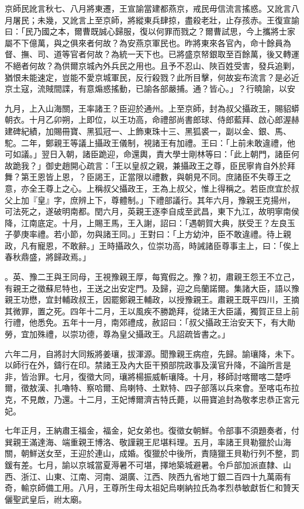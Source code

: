\begin{pinyinscope}
京師民訛言秋七、八月將東遷，王宣諭當建都燕京，戒民毋信流言搖惑。又訛言八月屠民；未幾，又訛言上至京師，將縱東兵肆掠，盡殺老壯，止存孩赤。王復宣諭曰：「民乃國之本，爾曹既誠心歸服，復以何罪而戮之？爾曹試思，今上攜將士家屬不下億萬，與之俱來者何故？為安燕京軍民也。昨將東來各官內，命十餘員為督、撫、司、道等官者何故？為統一天下也。已將盛京帑銀取至百餘萬，後又轉運不絕者何故？為供爾京城內外兵民之用也。且予不忍山、陜百姓受害，發兵追剿，猶恨未能速定，豈能不愛京城軍民，反行殺戮？此所目擊，何故妄布流言？是必近京土寇，流賊間諜，有意煽惑搖動，已諭各部嚴捕。通？皆心。」？行曉諭，以安

九月，上入山海關，王率諸王？臣迎於通州。上至京師，封為叔父攝政王，賜貂蟒朝衣。十月乙卯朔，上即位，以王功高，命禮部尚書郎球、侍郎藍拜、啟心郎渥赫建碑紀績，加賜冊寶、黑狐冠一、上飾東珠十三、黑狐裘一，副以金、銀、馬、駝。二年，鄭親王等議上攝政王儀制，視諸王有加禮。王曰：「上前未敢違禮，他可如議。」翌日入朝，諸臣跪迎，命還輿，責大學士剛林等曰：「此上朝門，諸臣何故跪我？」御史趙開心疏言：「王以皇叔之親，兼攝政王之尊，臣民寧肯自外於拜舞？第王恩皆上恩，？臣謁王，正當限以禮數，與朝見不同。庶諸臣不失尊王之意，亦全王尊上之心。上稱叔父攝政王，王為上叔父，惟上得稱之。若臣庶宜於叔父上加『皇』字，庶辨上下，尊體制。」下禮部議行。其年六月，豫親王克揚州，可法死之，遂破明南都。閏六月，英親王逐李自成至武昌，東下九江，故明寧南侯降，江南底定。十月，上賜王馬，王入謝，詔曰：「遇朝賀大典，朕受王？左良玉子夢庚率禮。若小節，勿與諸王同。」王對曰：「上方幼沖，臣不敢違禮。待上親政，凡有寵恩，不敢辭。」王時攝政久，位崇功高，時誡諸臣尊事主上，曰：「俟上春秋鼎盛，將歸政焉。」

。英、豫二王與王同母，王視豫親王厚，每寬假之。豫？初，肅親王怨王不立己，有親王之徵蘇尼特也，王送之出安定門。及歸，迎之烏蘭諾爾。集諸大臣，語以豫親王功懋，宜封輔政叔王，因罷鄭親王輔政，以授豫親王。肅親王既平四川，王摘其微罪，置之死。四年十二月，王以風疾不勝跪拜，從諸王大臣議，獨賀正旦上前行禮，他悉免。五年十一月，南郊禮成，赦詔曰：「叔父攝政王治安天下，有大勛勞，宜加殊禮，以崇功德，尊為皇父攝政王。凡詔疏皆書之。」

六年二月，自將討大同叛將姜瓖，拔渾源。聞豫親王病痘，先歸。諭瓖降，未下。以師行在外，鑄行在印。禁諸王及內大臣干預部院政事及漢官升降，不論所言是非，皆治罪。七月，復徵大同，瓖將楊振威斬瓖降。十月，移師討喀爾喀二楚呼爾，徵敖漢、扎嚕特、察哈爾、烏喇特、土默特、四子部落以兵來會。至喀屯布拉克，不見敵，乃還。十二月，王妃博爾濟吉特氏薨，以冊寶追封為敬孝忠恭正宮元妃。

七年正月，王納肅王福金，福金，妃女弟也。復徵女朝鮮。令部事不須題奏者，付巽親王滿達海、端重親王博洛、敬謹親王尼堪料理。五月，率諸王貝勒獵於山海關，朝鮮送女至，王迎於連山，成婚。復獵於中後所，責隨獵王貝勒行列不整，罰鍰有差。七月，諭以京城當夏溽暑不可堪，擇地築城避暑。令戶部加派直隸、山西、浙江、山東、江南、河南、湖廣、江西、陜西九省地丁銀二百四十九萬兩有奇，輸京師備工用。八月，王尊所生母太祖妃烏喇納拉氏為孝烈恭敏獻哲仁和贊天儷聖武皇后，祔太廟。


\end{pinyinscope}
